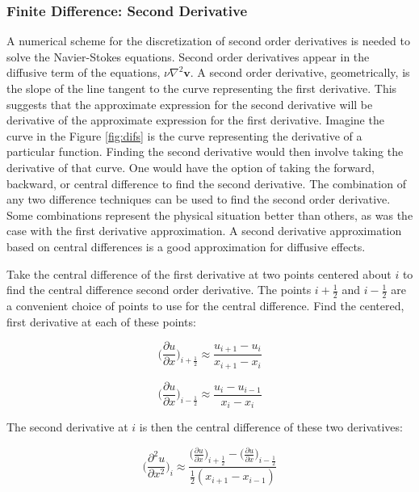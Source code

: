 \documentclass[twocolumn,12pth]{article}
\begin{document}
\subsubsection{Finite Difference: Second Derivative}

A numerical scheme for the discretization of second order derivatives is needed to solve the Navier-Stokes equations.
Second order derivatives appear in the diffusive term of the equations, $\nu\nabla^2\mathbf{v}$.
A second order derivative, geometrically, is the slope of the line tangent to the curve representing the first derivative.
This suggests that the approximate expression for the second derivative will be derivative of the approximate expression for the first derivative.
Imagine the curve in the Figure \ref{fig:difs} is the curve representing the derivative of a particular function. 
Finding the second derivative would then involve taking the derivative of that curve.
One would have the option of taking the forward, backward, or central difference to find the second derivative. 
The combination of any two difference techniques can be used to find the second order derivative.
Some combinations represent the physical situation better than others, as was the case with the first derivative approximation.
A second derivative approximation based on central differences is a good approximation for diffusive effects.

Take the central difference of the first derivative at two points centered about $i$ to find the central difference second order derivative.
The points $i + \frac{1}{2}$ and $i - \frac{1}{2}$ are a convenient choice of points to use for the central difference.
Find the centered, first derivative at each of these points:

\begin{equation}
\bigg(\frac{\partial{u}}{\partial{x}}\bigg)_{i + \frac{1}{2}} \approx \frac{u_{i+1} - u_i}{x_{i+1} - x_i}
\label{eq:11}
\end{equation}

\begin{equation}
\bigg(\frac{\partial{u}}{\partial{x}}\bigg)_{i - \frac{1}{2}} \approx \frac{u_{i} - u_{i-1}}{x_{i} - x_{i}}
\label{eq:12}
\end{equation}

The second derivative at $i$ is then the central difference of these two derivatives:

\begin{equation}
\bigg(\frac{\partial^2{u}}{\partial{x^2}}\bigg)_{i} \approx \frac{\big(\frac{\partial{u}}{\partial{x}}\big)_{i + \frac{1}{2}} -  \big(\frac{\partial{u}}{\partial{x}}\big)_{i - \frac{1}{2}}}{\frac{1}{2}(x_{i+1} - x_{i-1})}
\label{eq:13}
\end{equation}
\end{document}
